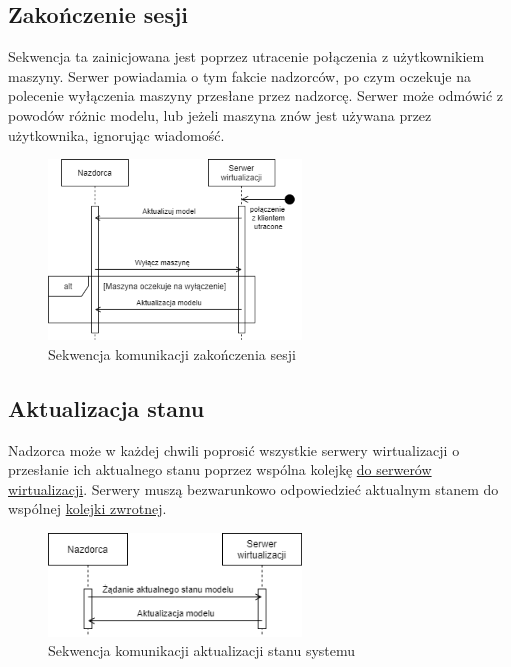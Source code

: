 \documentclass[../opis-rozwiazania.tex]{subfiles}
\begin{document}
\subsection{Zakończenie sesji}

Sekwencja ta zainicjowana jest poprzez utracenie połączenia z użytkownikiem maszyny.
Serwer powiadamia o tym fakcie nadzorców, po czym oczekuje na polecenie wyłączenia maszyny przesłane przez nadzorcę. Serwer może odmówić z powodów różnic modelu, lub jeżeli maszyna znów jest używana przez użytkownika, ignorując wiadomość.

\begin{figure}[H]
    \centering
    \includegraphics[width=0.6\textwidth]{../diagrams/sequence_diagrams/konczenie_sesji.png}
    \caption{Sekwencja komunikacji zakończenia sesji}
    \label{figure:diagrams:sequence_diagrams:konczenie_sesji}
\end{figure}

\subsection{Aktualizacja stanu}

Nadzorca może w każdej chwili poprosić wszystkie serwery wirtualizacji
o przesłanie ich aktualnego stanu poprzez wspólna kolejkę \hyperref[modules:broker:queue-virtsrv]{do serwerów wirtualizacji}.
Serwery muszą bezwarunkowo odpowiedzieć aktualnym stanem do wspólnej \hyperref[modules:broker:queue-overseers]{kolejki zwrotnej}.

\begin{figure}[H]
    \centering
    \includegraphics[width=0.6\textwidth]{../diagrams/sequence_diagrams/aktualizacja_stanu.png}
    \caption{Sekwencja komunikacji aktualizacji stanu systemu}
    \label{figure:diagrams:sequence_diagrams:aktualizacja_stanu}
\end{figure}
\end{document}
